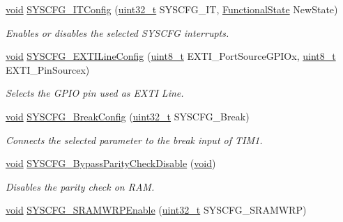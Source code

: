 \begin{DoxyCompactItemize}
\hyperlink{group___n_a_m_e_ga18028b8badbf1ea7e704ccac3c488e82}{void} \hyperlink{group___s_y_s_c_f_g___group1_ga57e56bd1370fd23fc3666f7402a12ee3}{S\-Y\-S\-C\-F\-G\-\_\-\-I\-T\-Config} (\hyperlink{stdint_8h_a435d1572bf3f880d55459d9805097f62}{uint32\-\_\-t} S\-Y\-S\-C\-F\-G\-\_\-\-I\-T, \hyperlink{group___exported__types_gac9a7e9a35d2513ec15c3b537aaa4fba1}{Functional\-State} New\-State)
\begin{DoxyCompactList}\small\item\em Enables or disables the selected S\-Y\-S\-C\-F\-G interrupts. \end{DoxyCompactList}\item 
\hyperlink{group___n_a_m_e_ga18028b8badbf1ea7e704ccac3c488e82}{void} \hyperlink{group___s_y_s_c_f_g___group1_gafedab1f64cef720aeafeafd409ba6ae7}{S\-Y\-S\-C\-F\-G\-\_\-\-E\-X\-T\-I\-Line\-Config} (\hyperlink{stdint_8h_aba7bc1797add20fe3efdf37ced1182c5}{uint8\-\_\-t} E\-X\-T\-I\-\_\-\-Port\-Source\-G\-P\-I\-Ox, \hyperlink{stdint_8h_aba7bc1797add20fe3efdf37ced1182c5}{uint8\-\_\-t} E\-X\-T\-I\-\_\-\-Pin\-Sourcex)
\begin{DoxyCompactList}\small\item\em Selects the G\-P\-I\-O pin used as E\-X\-T\-I Line. \end{DoxyCompactList}\item 
\hyperlink{group___n_a_m_e_ga18028b8badbf1ea7e704ccac3c488e82}{void} \hyperlink{group___s_y_s_c_f_g___group1_ga2d7c4952e531f348e5b2285fa7152ce2}{S\-Y\-S\-C\-F\-G\-\_\-\-Break\-Config} (\hyperlink{stdint_8h_a435d1572bf3f880d55459d9805097f62}{uint32\-\_\-t} S\-Y\-S\-C\-F\-G\-\_\-\-Break)
\begin{DoxyCompactList}\small\item\em Connects the selected parameter to the break input of T\-I\-M1. \end{DoxyCompactList}\item 
\hyperlink{group___n_a_m_e_ga18028b8badbf1ea7e704ccac3c488e82}{void} \hyperlink{group___s_y_s_c_f_g___group1_ga19e308f333739af09b0d7410bd362c40}{S\-Y\-S\-C\-F\-G\-\_\-\-Bypass\-Parity\-Check\-Disable} (\hyperlink{group___n_a_m_e_ga18028b8badbf1ea7e704ccac3c488e82}{void})
\begin{DoxyCompactList}\small\item\em Disables the parity check on R\-A\-M. \end{DoxyCompactList}\item 
\hyperlink{group___n_a_m_e_ga18028b8badbf1ea7e704ccac3c488e82}{void} \hyperlink{group___s_y_s_c_f_g___group1_gacea78546eaba3ab9e2a6bb9f3fd0f43c}{S\-Y\-S\-C\-F\-G\-\_\-\-S\-R\-A\-M\-W\-R\-P\-Enable} (\hyperlink{stdint_8h_a435d1572bf3f880d55459d9805097f62}{uint32\-\_\-t} S\-Y\-S\-C\-F\-G\-\_\-\-S\-R\-A\-M\-W\-R\-P)

\end{DoxyCompactItemize}
